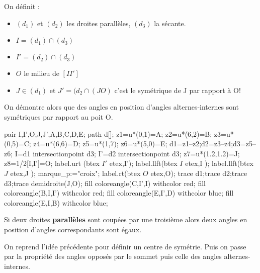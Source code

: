 \begin{preuve}

    \begin{minipage}{0.6\linewidth}
        On définit :
        \begin{itemize}
            \item  $(d_{1})$ et $(d_{2})$ les droites parallèles, $(d_{3})$ la sécante.
            \item  $I=(d_{1})\cap(d_{3})$
            \item  $I'=(d_{2})\cap(d_{3})$
            \item  $O$ le milieu de $[II']$
            \item  $J\in (d_{1})$ et $J'=(d_{2}\cap (JO)$ c'est le symétrique de J par rapport à O!
        \end{itemize}
        On démontre alors que des angles en position d'angles alternes-internes sont symétriques par rapport au poit O.
    \end{minipage}
    \hfill
    \begin{minipage}{0.3\linewidth}
        \begin{center}
            \begin{Geometrie}[CoinBG={(0,u)},CoinHD={(6u,6.5u)}]
                    pair I,I',O,J,J',A,B,C,D,E;
                    path d[];
                    z1=u*(0,1)=A;
                    z2=u*(6,2)=B;
                    z3=u*(0,5)=C;
                    z4=u*(6,6)=D;
                    z5=u*(1,7);
                    z6=u*(5,0)=E;
                    d1=z1--z2;d2=z3--z4;d3=z5--z6;
                    I=d1 intersectionpoint d3;
                    I'=d2 intersectionpoint d3;
                    z7=u*(1.2,1.2)=J;
                    z8=1/2[I,I']=O;
                    label.urt (btex $I'$ etex,I');
                    label.llft(btex $I $ etex,I );
                    label.llft(btex $J $ etex,J );
                    marque_p:="croix";
                    label.rt(btex $O$ etex,O);
                    trace d1;trace d2;trace d3;trace demidroite(J,O);
                    fill coloreangle(C,I',I) withcolor red;
                    fill coloreangle(B,I,I') withcolor red;
                    fill coloreangle(E,I',D) withcolor blue;
                    fill coloreangle(E,I,B) withcolor blue;
            \end{Geometrie}
        \end{center}
    \end{minipage}

\end{preuve}

\begin{propriete}
    Si deux droites \textbf{parallèles} sont coupées par une troisième alors deux angles en position d'angles correspondants sont égaux.
\end{propriete}

\begin{preuve}
    On reprend l'idée précédente pour définir un centre de symétrie.
    Puis on passe par la propriété des angles opposés par le sommet puis celle des angles alternes-internes.
\end{preuve}
